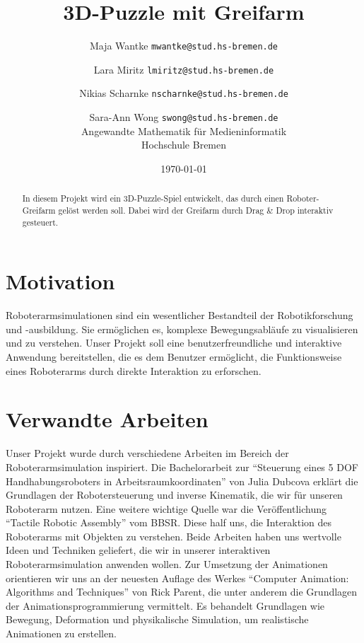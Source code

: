 \documentclass[german,a4paper,pdftex,12pt]{article}
\title{%
    3D-Puzzle mit Greifarm}
\author{
    Maja Wantke \texttt{mwantke@stud.hs-bremen.de} \and
    Lara Miritz \texttt{lmiritz@stud.hs-bremen.de} \and
    Nikias Scharnke \texttt{nscharnke@stud.hs-bremen.de} \and
    Sara-Ann Wong \texttt{swong@stud.hs-bremen.de} \\
    Angewandte Mathematik für Medieninformatik \\
    Hochschule Bremen}
\date{ \today}
\begin{document}
    \maketitle

    \begin{abstract}
        In diesem Projekt wird ein 3D-Puzzle-Spiel entwickelt, das durch einen Roboter-Greifarm gelöst werden soll.
        Dabei wird der Greifarm durch Drag \& Drop interaktiv gesteuert.
    \end{abstract}


    \section{Motivation}
    Roboterarmsimulationen sind ein wesentlicher Bestandteil der Robotikforschung und -ausbildung. Sie ermöglichen es,
    komplexe Bewegungsabläufe zu visualisieren und zu verstehen. Unser Projekt soll eine benutzerfreundliche und
    interaktive Anwendung bereitstellen, die es dem Benutzer ermöglicht, die Funktionsweise eines Roboterarms durch
    direkte Interaktion zu erforschen.


    \section{Verwandte Arbeiten}
    Unser Projekt wurde durch verschiedene Arbeiten im Bereich der Roboterarmsimulation inspiriert.
    Die Bachelorarbeit zur "`Steuerung eines 5 DOF Handhabungsroboters in Arbeitsraumkoordinaten"'\cite{Far01} von Julia Dubcova
    erklärt die Grundlagen der Robotersteuerung und inverse Kinematik, die wir für unseren Roboterarm nutzen.
    Eine weitere wichtige Quelle war die Veröffentlichung "`Tactile Robotic Assembly"'\cite{Far02} vom BBSR.
    Diese half uns, die Interaktion des Roboterarms mit Objekten zu verstehen.
    Beide Arbeiten haben uns wertvolle Ideen und Techniken geliefert, die wir in unserer interaktiven Roboterarmsimulation anwenden wollen.
    Zur Umsetzung der Animationen orientieren wir uns an der neuesten Auflage des Werkes "`Computer Animation: Algorithms and Techniques"'\cite{Far03} von Rick Parent,
    die unter anderem die Grundlagen der Animationsprogrammierung vermittelt.
    Es behandelt Grundlagen wie Bewegung, Deformation und physikalische Simulation, um realistische Animationen zu erstellen.
\end{document}
